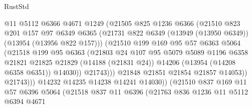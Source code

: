 \begin{lexlean}{RustStd}
\begin{coremodule}
                          @11
                          @5112
                          @6366
                          @4671
                          @1249
                          (@21505
                            @825
                            @1236
                            @6366
                            (@21510
                              @823
                              @201
                              @157
                              @97
                              @6349
                              @6365
                              (@21731
                                @822
                                @6349
                                (@13949 (@13950 @6349))
                                (@13954 (@13956 @822 @157)))
                              (@21510
                                @199
                                @169
                                @95
                                @57
                                @6363
                                @5064
                                (@21518
                                  @199
                                  @95
                                  @6363
                                  (@21803
                                    @24
                                    @107
                                    @95
                                    @5079
                                    @5089
                                    @1196
                                    @6358
                                    @21821
                                    @21825
                                    @21829
                                    (@14188 (@21831 @24))
                                    @14206
                                    (@13954 (@14208 @6358 @6351))
                                    @14030))
                                @21743)))
                          @21848
                          @21851
                          @21854
                          @21857
                          @14053))
                      @21743)))
                @14232
                @14235
                @14238
                @14241
                @14030))
            (@21510
              @837
              @169
              @11
              @57
              @6396
              @5064
              (@21518
                @837
                @11
                @6396
                (@21763
                  @836
                  @1236
                  @11
                  @5112
                  @6394
                  @4671

\end{coremodule}
\end{lexlean}
